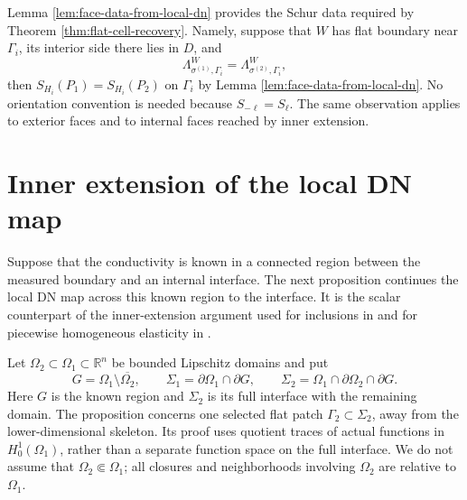 \documentclass[11pt,oneside]{article}
\newcommand{\R}{\mathbb R}
\newcommand{\DN}{\Lambda}
\begin{document}
Lemma \ref{lem:face-data-from-local-dn} provides the Schur data required by
Theorem \ref{thm:flat-cell-recovery}.  Namely, suppose that \(W\) has flat
boundary near \(\Gamma_i\), its interior side there lies in \(D\), and
\begin{equation}
  \DN^W_{\sigma^{(1)},\Gamma_i}=\DN^W_{\sigma^{(2)},\Gamma_i},
\end{equation}
then \(S_{H_i}(P_1)=S_{H_i}(P_2)\) on \(\Gamma_i\) by Lemma
\ref{lem:face-data-from-local-dn}.  No orientation convention is needed because
\(S_{-\ell}=S_\ell\).  The same observation applies to exterior faces and to
internal faces reached by inner extension.


\section{Inner extension of the local DN map}
\label{sec:inner-extension}

Suppose that the conductivity is known in a connected region between the
measured boundary and an internal interface.  The next proposition continues
the local DN map across this known region to the interface.  It is the scalar
counterpart of the inner-extension argument used for inclusions in
\cite{Ikehata2002} and for piecewise homogeneous elasticity in
\cite{CarsteaHondaNakamura2018}.

Let \(\Omega_2\subset\Omega_1\subset\R^n\) be bounded Lipschitz domains and put
\begin{equation}
  G=\Omega_1\setminus\overline{\Omega_2},
  \qquad
  \Sigma_1=\partial\Omega_1\cap\partial G,
  \qquad
  \Sigma_2=\Omega_1\cap\partial\Omega_2\cap\partial G .
\end{equation}
Here \(G\) is the known region and \(\Sigma_2\) is its full interface with the
remaining domain.  The proposition concerns one selected flat patch
\(\Gamma_2\subset\Sigma_2\), away from the lower-dimensional skeleton.  Its
proof uses quotient traces of actual functions in \(H^1_0(\Omega_1)\), rather
than a separate function space on the full interface.  We do not assume that
\(\Omega_2\Subset\Omega_1\); all closures and neighborhoods involving
\(\Omega_2\) are relative to \(\Omega_1\).
\end{document}
